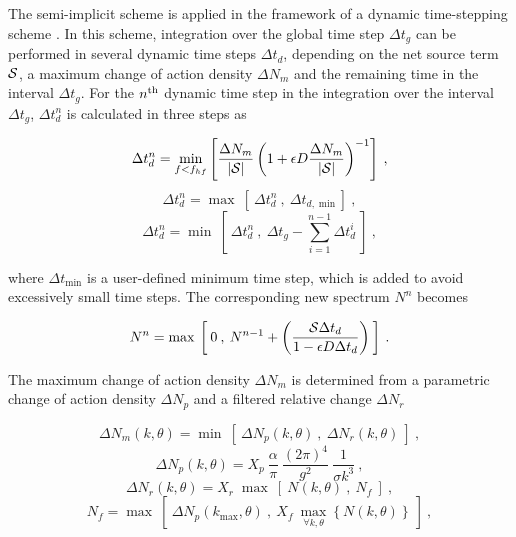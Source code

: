 The semi-implicit scheme is applied in the framework of a dynamic
time-stepping scheme \citep{tol:JPO92}. In this scheme, integration over the
global time step $\Delta t_g$ can be performed in several dynamic time steps
$\Delta t_d$, depending on the net source term ${\cal S}$, a maximum change of
action density $\Delta N_m$ and the remaining time in the interval $\Delta
t_g$. For the $n^{\rm th}$ dynamic time step in the integration over the
interval $\Delta t_g$, $\Delta t_d^n$ is calculated in three steps as


\begin{equation}
\Delta t_d^n = 
\min_{f<f_{hf}} \left [ \frac{\Delta N_m}{|{\cal S}|}
\left ( 1 + \epsilon D \frac{\Delta N_m}{|{\cal S}|} \right ) ^{-1}
\right ] \: , \label{eq:st_d_1}
\end{equation} \begin{equation}
\Delta t_d^n = \max \: \left [ \: \Delta t_d^n \: , \: 
\Delta t_{d,\min} \right ] \: , \label{eq:st_d_2a}
\end{equation} \begin{equation}
\Delta t_d^n = \min \: \left [ \: \Delta t_d^n \: , \: 
\Delta t_g - \sum_{i=1}^{n-1} \Delta t_d^i
 \: \right ] \: , \label{eq:st_d_2b}
\end{equation}

\noindent
where $\Delta t_{\min}$ is a user-defined minimum time step, which is added to
avoid excessively small time steps. The corresponding new spectrum $N^n$
becomes

\begin{equation}
N^n = \max\: \left [ \: 0 \: , \: N^{n-1} + 
\left ( \frac{{\cal S} \Delta t_d}{1 - \epsilon D \Delta t_d} \right )
\: \right ] \: . \label{eq:st_d_3}
\end{equation}

\noindent 
The maximum change of action density $\Delta N_m$ is determined from a
parametric change of action density $\Delta N_p$ and a filtered relative
change $\Delta N_r$


\begin{equation}
\Delta N_m (k,\theta) = \min \: \left [ \:
\Delta N_p (k,\theta) \: , \: \Delta N_r (k,\theta) 
\: \right ] \: , \label{eq:st_d_4}
\end{equation} \begin{equation}
\Delta N_p (k,\theta) = X_p \: \frac{\alpha}{\pi} \:
\frac{(2\pi)^4}{g^2} \: \frac{1}{\sigma k^3}
\: , \label{eq:st_d_5}
\end{equation} \begin{equation}
\Delta N_r (k,\theta) = X_r \; \max \: \left [ \: 
N(k,\theta) \: , \: N_f \: \right ] \: , \label{eq:st_d_6}
\end{equation} \begin{equation}
N_f = \max \: \left [ \: \Delta N_p (k_{\max},\theta) \: , 
\: X_f \: \max_{\forall k,\theta} \left \{ N(k,\theta) \right \}
\: \right ] \: , \label{eq:st_d_7} \end{equation}

